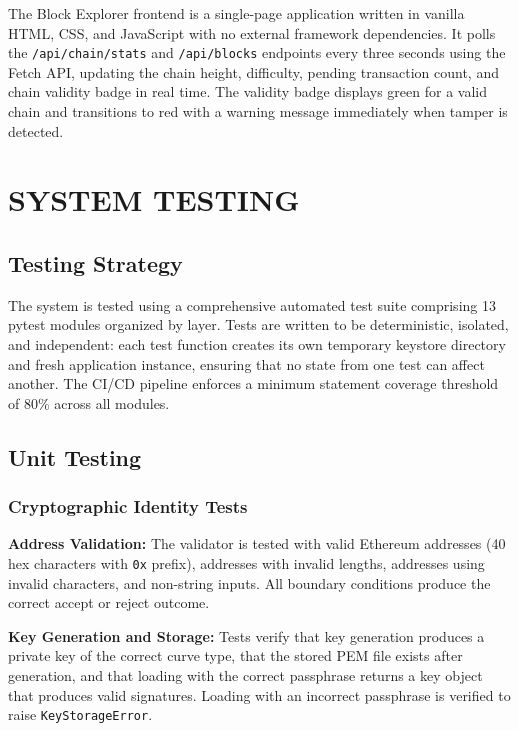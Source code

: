 \documentclass[12pt,a4paper]{report}
\begin{document}
The Block Explorer frontend is a single-page application written in vanilla HTML, CSS, and
JavaScript with no external framework dependencies. It polls the \texttt{/api/chain/stats}
and \texttt{/api/blocks} endpoints every three seconds using the Fetch API, updating the
chain height, difficulty, pending transaction count, and chain validity badge in real time.
The validity badge displays green for a valid chain and transitions to red with a warning
message immediately when tamper is detected.

\chapter{SYSTEM TESTING}

\section{Testing Strategy}

The system is tested using a comprehensive automated test suite comprising 13 pytest
modules organized by layer. Tests are written to be deterministic, isolated, and
independent: each test function creates its own temporary keystore directory and fresh
application instance, ensuring that no state from one test can affect another. The
CI/CD pipeline enforces a minimum statement coverage threshold of 80\% across all modules.

\section{Unit Testing}

\subsection{Cryptographic Identity Tests}

\textbf{Address Validation:} The validator is tested with valid Ethereum addresses
(40 hex characters with \texttt{0x} prefix), addresses with invalid lengths, addresses
using invalid characters, and non-string inputs. All boundary conditions produce the
correct accept or reject outcome.

\textbf{Key Generation and Storage:} Tests verify that key generation produces a private
key of the correct curve type, that the stored PEM file exists after generation, and that
loading with the correct passphrase returns a key object that produces valid signatures.
Loading with an incorrect passphrase is verified to raise \texttt{KeyStorageError}.
\end{document}
